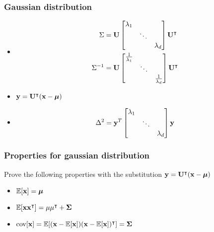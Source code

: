 \documentclass[10pt,mathserif]{beamer}
\begin{document}
\begin{frame}
\frametitle{Gaussian distribution}
\begin{itemize}\itemsep=12pt
\item
\begin{align}
\Sigma &= \mathbf{U}\begin{bmatrix}\lambda_1&& \\ &\ddots&\\&&\lambda_d\end{bmatrix} \mathbf{U}^\intercal \nonumber\\
\Sigma^{-1} &= \mathbf{U}\begin{bmatrix}\frac{1}{\lambda_1}&&\\&\ddots&\\&&\frac{1}{\lambda_d}\end{bmatrix} \mathbf{U}^\intercal \nonumber
\end{align}
\item $\mathbf{y} = \mathbf{U}^\intercal (\mathbf{x}-\boldsymbol{\mu})$
\item 
\begin{align}
\Delta^2 = \mathbf{y}^T\begin{bmatrix}\lambda_1&& \\ &\ddots&\\&&\lambda_d\end{bmatrix}\mathbf{y}\nonumber
\end{align}
\end{itemize}
\end{frame}

\begin{frame}
\frametitle{Properties for gaussian distribution}
Prove the following properties with the substitution $\mathbf{y} = \mathbf{U}^\intercal (\mathbf{x}-\boldsymbol{\mu})$
\begin{itemize}\itemsep=12pt
\item $\mathbb{E}[\mathbf{x}] = \boldsymbol{\mu}$
\item $\mathbb{E}[\mathbf{x}\mathbf{x}^\intercal] = \mu\mu^\intercal + \boldsymbol{\Sigma}$
\item $\mathrm{cov}[\mathbf{x}] = \mathbb{E}[(\mathbf{x}-\mathbb{E}[\mathbf{x}])(\mathbf{x}-\mathbb{E}[\mathbf{x}])^\intercal] = \boldsymbol{\Sigma}$
\end{itemize}
\end{frame}
\end{document}
